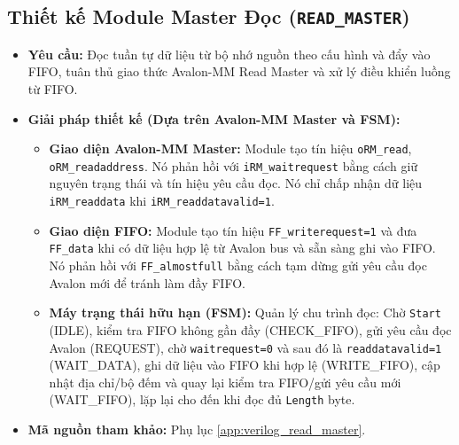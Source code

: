 \subsection{Thiết kế Module Master Đọc (\texttt{READ\_MASTER})}
\begin{itemize}
    \item \textbf{Yêu cầu:} Đọc tuần tự dữ liệu từ bộ nhớ nguồn theo cấu hình và đẩy vào FIFO, tuân thủ giao thức Avalon-MM Read Master và xử lý điều khiển luồng từ FIFO.
    \item \textbf{Giải pháp thiết kế (Dựa trên Avalon-MM Master và FSM):}
        \begin{itemize}
            \item \textbf{Giao diện Avalon-MM Master:} Module tạo tín hiệu \texttt{oRM\_read}, \texttt{oRM\_readaddress}. Nó phản hồi với \texttt{iRM\_waitrequest} bằng cách giữ nguyên trạng thái và tín hiệu yêu cầu đọc. Nó chỉ chấp nhận dữ liệu \texttt{iRM\_readdata} khi \texttt{iRM\_readdatavalid=1}.
            \item \textbf{Giao diện FIFO:} Module tạo tín hiệu \texttt{FF\_writerequest=1} và đưa \texttt{FF\_data} khi có dữ liệu hợp lệ từ Avalon bus và sẵn sàng ghi vào FIFO. Nó phản hồi với \texttt{FF\_almostfull} bằng cách tạm dừng gửi yêu cầu đọc Avalon mới để tránh làm đầy FIFO.
            \item \textbf{Máy trạng thái hữu hạn (FSM):} Quản lý chu trình đọc: Chờ \texttt{Start} (IDLE), kiểm tra FIFO không gần đầy (CHECK\_FIFO), gửi yêu cầu đọc Avalon (REQUEST), chờ \texttt{waitrequest=0} và sau đó là \texttt{readdatavalid=1} (WAIT\_DATA), ghi dữ liệu vào FIFO khi hợp lệ (WRITE\_FIFO), cập nhật địa chỉ/bộ đếm và quay lại kiểm tra FIFO/gửi yêu cầu mới (WAIT\_FIFO), lặp lại cho đến khi đọc đủ \texttt{Length} byte.
        \end{itemize}
    \item \textbf{Mã nguồn tham khảo:} Phụ lục \ref{app:verilog_read_master}.
\end{itemize}

